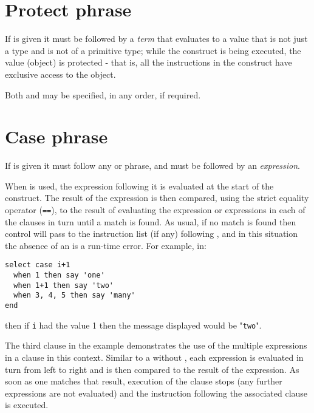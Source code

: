 \section{Protect phrase}
 
If  is given it must be followed by a \emph{term}
that evaluates to a value that is not just a type and is not of a
primitive type;
while the  construct is being executed, the value
(object) is protected - that is, all the instructions in the
 construct have exclusive access to the object.
 
Both  and  may be specified, in any order,
if required.
\section{Case phrase}
 
If  is given it must follow any  or
 phrase, and must be followed by an
\emph{expression}.
 
When  is used, the expression following it is evaluated at
the start of the  construct.
The result of the expression is then compared, using the strict equality
operator (\texttt{==}), to the result of evaluating the expression
or expressions in each of the  clauses in turn until
a match is found.  As usual, if no match is found then control
will pass to the instruction list (if any) following
, and in this situation the absence of an
 is a run-time error.
 For example, in:
\begin{lstlisting}
select case i+1
  when 1 then say 'one'
  when 1+1 then say 'two'
  when 3, 4, 5 then say 'many'
end
\end{lstlisting}
then if \texttt{i} had the value 1 then the message displayed would be
"\texttt{two}".
 
The third  clause in the example demonstrates the use of the
multiple expressions in a  clause in this context.
Similar to a  without , each
expression is evaluated in turn from left to right and is then
compared to the result of the  expression.
As soon as one matches that result, execution of the
 clause stops (any further expressions are not
evaluated) and the instruction following the associated
 clause is executed.

